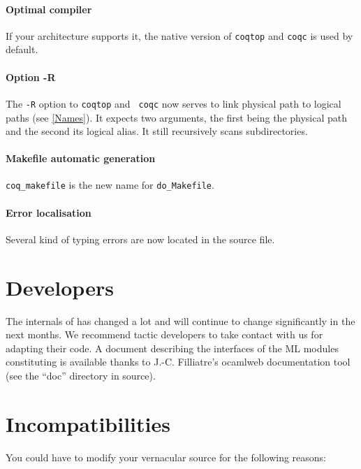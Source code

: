 \documentclass[11pt]{article}
\begin{document}
\paragraph{Optimal compiler} If your architecture supports it, the native
version of {\tt coqtop} and {\tt coqc} is used by default.

\paragraph{Option -R} The {\tt -R} option to {\tt coqtop} and {\tt
coqc} now serves to link physical path to logical paths (see
\ref{Names}). It expects two arguments, the first being the physical
path and the second its logical alias. It still recursively scans
subdirectories.

\paragraph{Makefile automatic generation} {\tt coq\_makefile} is the
new name for {\tt do\_Makefile}.

\paragraph{Error localisation} Several kind of typing errors are now
located in the source file.

\section{Developers}
\label{Developers}
The internals of {\Coq} has changed a lot and will continue to change
significantly in the next months. We recommend tactic developers to
take contact with us for adapting their code. A document describing
the interfaces of the ML modules constituting {\Coq} is available
thanks to J.-C. Filliatre's ocamlweb
documentation tool (see the ``doc'' directory in {\Coq} source).

\section{Incompatibilities}
\label{Incompatibilities}

  You could have to modify your vernacular source for the following
  reasons:
\end{document}
